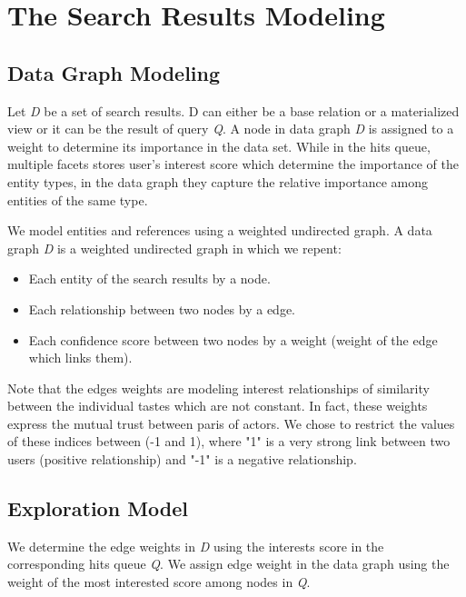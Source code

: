 \chapter{The Search Results Modeling}

\section{Data Graph Modeling}

Let {\it D} be a set of search results. D can either be a base relation or a materialized view or it can be the result of query {\it Q}. A node in data graph {\it D} is assigned to a weight to determine its importance in the data set. While in the hits queue, multiple facets stores user's interest score which determine the importance of the entity types, in the data graph they capture the relative importance among entities of the same type. 

We model entities and references using a weighted undirected graph. A data graph {\it D} is a weighted undirected graph in which we repent:
\begin{itemize}
	\item Each entity of the search results by a node.
	\item Each relationship between two nodes by a edge.
	\item Each confidence score between two nodes by a weight (weight of the edge which links them).
\end{itemize}
Note that the edges weights are modeling interest relationships of similarity between the individual tastes which are not constant. In fact, these weights express the mutual trust between paris of actors. We chose to restrict the values of these indices between (-1 and 1), where "1" is a very strong link between two users (positive relationship) and "-1" is a negative relationship.

\section{Exploration Model}

We determine the edge weights in {\it D} using the interests score in the corresponding hits queue {\it Q}. We assign edge weight in the data graph using the weight of the most interested score among nodes in {\it Q}.
